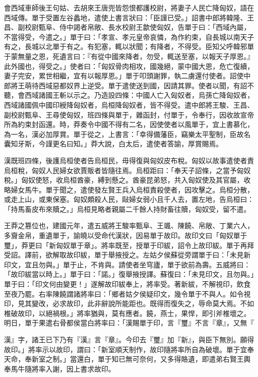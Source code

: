 \begin{pinyinscope}
會西域車師後王句姑、去胡來王唐兜皆怨恨都護校尉，將妻子人民亡降匈奴，語在西域傳。單于受置左谷蠡地，遣使上書言狀曰：「臣謹已受。」詔書中郎將韓隆、王昌、副校尉甄阜、侍中謁者帛敞、長水校尉王歙使匈奴，告單于曰：「西域內屬，不當得受，今遣之。」單于曰：「孝宣、孝元皇帝哀憐，為作約束，自長城以南天子有之，長城以北單于有之。有犯塞，輒以狀聞；有降者，不得受。臣知父呼韓邪單于蒙無量之恩，死遺言曰：『有從中國來降者，勿受，輒送至塞，以報天子厚恩。』此外國也，得受之。」使者曰：「匈奴骨肉相攻，國幾絕，蒙中國大恩，危亡復續，妻子完安，累世相繼，宜有以報厚恩。」單于叩頭謝罪，執二虜還付使者。詔使中郎將王萌待西域惡都奴界上逆受。單于遣使送到國，因請其罪。使者以聞，有詔不聽，會西域諸國王斬以示之。乃造設四條：中國人亡入匈奴者，烏孫亡降匈奴者，西域諸國佩中國印綬降匈奴者，烏桓降匈奴者，皆不得受。遣中郎將王駿、王昌、副校尉甄阜、王尋使匈奴，班四條與單于，雜函封，付單于，令奉行，因收故宣帝所為約束封函還。時，莽奏令中國不得有二名，因使使者以風單于，宜上書慕化，為一名，漢必加厚賞。單于從之，上書言：「幸得備藩臣，竊樂太平聖制，臣故名囊知牙斯，今謹更名曰知。」莽大說，白太后，遣使者答諭，厚賞賜焉。

漢既班四條，後護烏桓使者告烏桓民，毋得復與匈奴皮布稅。匈奴以故事遣使者責烏桓稅，匈奴人民婦女欲賈販者皆隨往焉。烏桓距曰：「奉天子詔條，之當予匈奴稅。」匈奴使怒，收烏桓酋豪，縛到懸之。酋豪昆弟怒，共入匈奴使及其官屬，收略婦女馬牛。單于聞之，遣使發左賢王兵入烏桓責殺使者，因攻擊之。烏桓分散，或走上山，或東保塞。匈奴頗殺人民，敺婦女弱小且千人去，置左地，告烏桓曰：「持馬畜皮布來贖之。」烏桓見略者親屬二千餘人持財畜往贖，匈奴受，留不遣。

王莽之篡位也，建國元年，遣五威將王駿率甄阜、王颯、陳饒、帛敞、丁業六人，多齎金帛，重遺單于，諭曉以受命代漢狀，因易單于故印。故印文曰「匈奴單于璽」，莽更曰「新匈奴單于章」。將率既至，授單于印紱，詔令上故印紱。單于再拜受詔。譯前，欲解取故印紱，單于舉掖授之。左姑夕侯蘇從旁謂單于曰：「未見新印文，宜且勿與。」單于止，不肯與。請使者坐穹廬，單于欲前為壽。五威將曰：「故印紱當以時上。」單于曰：「諾。」復舉掖授譯。蘇復曰：「未見印文，且勿與。」單于曰：「印文何由變更！」遂解故印紱奉上，將率受。著新紱，不解視印，飲食至夜乃罷。右率陳饒謂諸將率曰：「鄉者姑夕侯疑印文，幾令單于不與人。如令視印，見其變改，必求故印，此非辭說所能距也。既得而復失之，辱命莫大焉。不如椎破故印，以絕禍根。」將率猶與，莫有應者。饒，燕士，果悍，即引斧椎壞之。明日，單于果遣右骨都侯當白將率曰：「漢賜單于印，言『璽』不言『章』，又無『

漢』字，諸王已下乃有『漢』言『章』。今印去『璽』加『新』，與臣下無別。願得故印。」將率示以故印，謂曰：「新室順天制作，故印隨將率所自為破壞。單于宜奉天命，奉新室之制。」當還白，單于知已無可奈何，又多得賂遺，即遣弟右賢王輿奉馬牛隨將率入謝，因上書求故印。


\end{pinyinscope}
